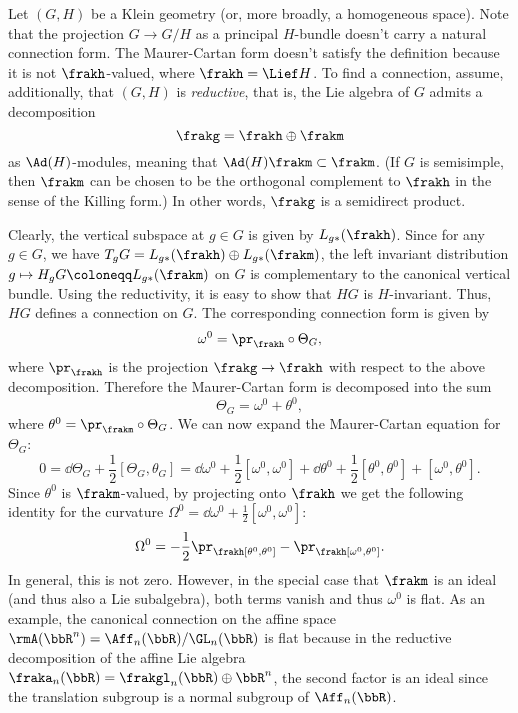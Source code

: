 \begin{example}\label{ex 1.3.19 RS2}
    Let $(G,H)$ be a Klein geometry (or, more broadly, a homogeneous space). Note that the projection $G\to G\slash H$ as a principal $H$-bundle doesn't carry a natural connection form. The Maurer-Cartan form doesn't satisfy the definition because it is not $\frakh$-valued, where $\frakh=\Lief H$. To find a connection, assume, additionally, that $(G,H)$ is \emph{reductive}, that is, the Lie algebra of $G$ admits a decomposition
    \[\frakg=\frakh\oplus\frakm\]
    as $\Ad(H)$-modules, meaning that $\Ad(H)\frakm\subset \frakm$. (If $G$ is semisimple, then $\frakm$ can be chosen to be the orthogonal complement to $\frakh$ in the sense of the Killing form.) In other words, $\frakg$ is a semidirect product.

    Clearly, the vertical subspace at $g\in G$ is given by $L_{g\ast}(\frakh)$. Since for any $g\in G$, we have $T_gG=L_{g\ast}(\frakh)\oplus L_{g\ast}(\frakm)$, the left invariant distribution $g\mapsto H_gG\coloneqq L_{g\ast}(\frakm)$ on $G$ is complementary to the canonical vertical bundle. Using the reductivity, it is easy to show that $HG$ is $H$-invariant. Thus, $HG$ defines a connection on $G$. The corresponding connection form is given by
    \[\omega^0=\pr_\frakh\circ \Theta_G,\]
    where $\pr_\frakh$ is the projection $\frakg\to \frakh$ with respect to the above decomposition. Therefore the Maurer-Cartan form is decomposed into the sum
    \[\Theta_G=\omega^0+\theta^0,\]
    where $\theta^0=\pr_{\frakm}\circ\Theta_G$. We can now expand the Maurer-Cartan equation for $\Theta_G$:
    \[0=\dd \Theta_G+\frac12[\Theta_G,\theta_G]=\dd \omega^0+\frac12[\omega^0,\omega^0]+\dd \theta^0+\frac12[\theta^0,\theta^0]+[\omega^0,\theta^0].\]
    Since $\theta^0$ is $\frakm$-valued, by projecting onto $\frakh$ we get the following identity for the curvature $\Omega^0=\dd\omega^0+\frac12[\omega^0,\omega^0]$:
    \[\Omega^0=-\frac12\pr_\frakh[\theta^0,\theta^0]-\pr_\frakh[\omega^0,\theta^0].\]
    In general, this is not zero. However, in the special case that $\frakm$ is an ideal (and thus also a Lie subalgebra), both terms vanish and thus $\omega^0$ is flat. As an example, the canonical connection on the affine space $\rmA(\bbR^n)=\Aff_n(\bbR)\slash \GL_n(\bbR)$ is flat because in the reductive decomposition of the affine Lie algebra $\fraka_n(\bbR)=\frakgl_n(\bbR)\oplus \bbR^n$, the second factor is an ideal since the translation subgroup is a normal subgroup of $\Aff_n(\bbR)$.
\end{example}

